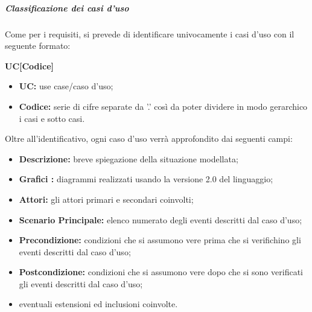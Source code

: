 			\subparagraph{Classificazione dei casi d'uso}
			Come per i requisiti, si prevede di identificare univocamente i casi d'uso con il seguente formato:
			\begin{center}
				\textbf{UC[Codice]}
			\end{center}
			\begin{itemize}
				\item \textbf{UC:} use case/caso d'uso;
				\item \textbf{Codice:} serie di cifre separate da ’.’ così da poter dividere in modo gerarchico i casi e sotto casi.
			\end{itemize}
			Oltre all'identificativo, ogni caso d'uso verrà approfondito dai seguenti campi:
			\begin{itemize}
				\item \textbf{Descrizione:} breve spiegazione della situazione modellata;
				\item \textbf{Grafici :} diagrammi realizzati usando la versione 2.0 del linguaggio;
				\item \textbf{Attori:} gli attori primari e secondari coinvolti;
				\item \textbf{Scenario Principale:} elenco numerato degli eventi descritti dal caso d'uso;
				\item \textbf{Precondizione:} condizioni che si assumono vere prima che si verifichino gli eventi descritti dal caso d'uso;
				\item \textbf{Postcondizione:} condizioni che si assumono vere dopo che si sono verificati gli eventi descritti dal caso d'uso;
				\item eventuali estensioni ed inclusioni coinvolte.
			\end{itemize}


